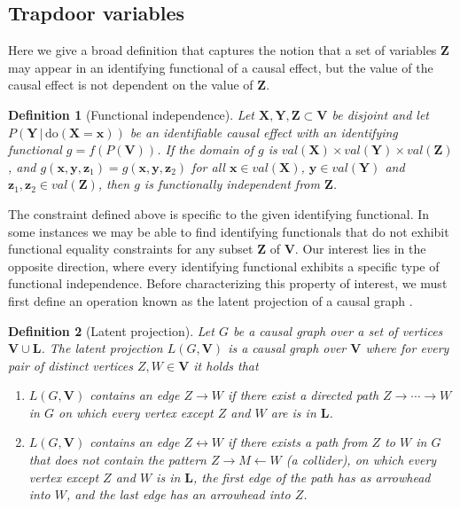 \documentclass{statsoc}
\newcommand{\+}[1]{\ensuremath{\mathbf{#1}}}
\newtheorem{definition}{Definition}
\newcommand{\doo}{\textrm{do}}
\newcommand{\given}{{ \, | \, }}
\begin{document}
\subsection{Trapdoor variables}
Here we give a broad definition that captures the notion that a set of variables $\+ Z$ may appear in an identifying functional of a causal effect, but the value of the causal effect is not dependent on the value of $\+ Z$. 
\begin{definition}[Functional independence]
Let $\+ X, \+Y, \+ Z \subset \+ V$ be disjoint and let $P(\+Y \given \doo(\+ X  = \+ x))$ be an identifiable causal effect with an identifying functional $g = f(P(\+ V))$. If the domain of $g$ is $val(\+ X) \times val(\+ Y) \times val(\+ Z)$, and $g(\+ x, \+ y, \+ z_1) = g(\+ x, \+ y, \+ z_2)$ for all $\+ x \in val(\+ X)$, $\+y \in val(\+ Y)$ and $\+ z_1,\+ z_2 \in val(\+ Z)$, then $g$ is \emph{functionally independent} from $\+ Z$. 
\end{definition}
The constraint defined above is specific to the given identifying functional. In some instances we may be able to find identifying functionals that do not exhibit functional equality constraints for any subset $\+ Z$ of $\+ V$. Our interest lies in the opposite direction, where every identifying functional exhibits a specific type of functional independence. Before characterizing this property of interest, we must first define an operation known as the latent projection of a causal graph \citep{pearl1991}.
\begin{definition}[Latent projection] Let $G$ be a causal graph over a set of vertices $\+ V \cup \+ L$. The \emph{latent projection} $L(G, \+ V)$ is a causal graph over $\+ V$ where for every pair of distinct vertices $Z,W \in \+ V$ it holds that
\begin{enumerate}
  \item $L(G, \+ V)$ contains an edge $Z \longrightarrow W$ if there exist a directed path $Z \longrightarrow \cdots \longrightarrow W$ in $G$ on which every vertex except $Z$ and $W$ are is in $\+ L$.
  \item $L(G, \+ V)$ contains an edge $Z \longleftrightarrow W$ if there exists a path from $Z$ to $W$ in $G$ that does not contain the pattern $Z \longrightarrow M \longleftarrow W$ (a collider), on which every vertex except $Z$ and $W$ is in $\+ L$, the first edge of the path has as arrowhead into $W$, and the last edge has an arrowhead into $Z$.
\end{enumerate}
\end{definition}
\end{document}
